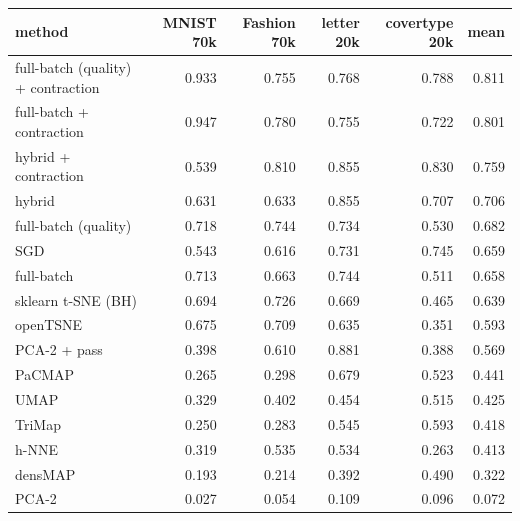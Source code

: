 \begin{tabular}{lrrrrr}
\toprule
method & MNIST 70k & Fashion 70k & letter 20k & covertype 20k & mean \\
\midrule
\magnet{} full-batch (quality) + contraction & 0.933 & 0.755 & 0.768 & 0.788 & 0.811 \\
\magnet{} full-batch + contraction & 0.947 & 0.780 & 0.755 & 0.722 & 0.801 \\
\magnet{} hybrid + contraction & 0.539 & 0.810 & 0.855 & 0.830 & 0.759 \\
\magnet{} hybrid & 0.631 & 0.633 & 0.855 & 0.707 & 0.706 \\
\magnet{} full-batch (quality) & 0.718 & 0.744 & 0.734 & 0.530 & 0.682 \\
\magnet{} SGD & 0.543 & 0.616 & 0.731 & 0.745 & 0.659 \\
\magnet{} full-batch & 0.713 & 0.663 & 0.744 & 0.511 & 0.658 \\
sklearn t-SNE (BH) & 0.694 & 0.726 & 0.669 & 0.465 & 0.639 \\
openTSNE & 0.675 & 0.709 & 0.635 & 0.351 & 0.593 \\
PCA-2 + pass & 0.398 & 0.610 & 0.881 & 0.388 & 0.569 \\
PaCMAP & 0.265 & 0.298 & 0.679 & 0.523 & 0.441 \\
UMAP & 0.329 & 0.402 & 0.454 & 0.515 & 0.425 \\
TriMap & 0.250 & 0.283 & 0.545 & 0.593 & 0.418 \\
h-NNE & 0.319 & 0.535 & 0.534 & 0.263 & 0.413 \\
densMAP & 0.193 & 0.214 & 0.392 & 0.490 & 0.322 \\
PCA-2 & 0.027 & 0.054 & 0.109 & 0.096 & 0.072 \\
\bottomrule
\end{tabular}
